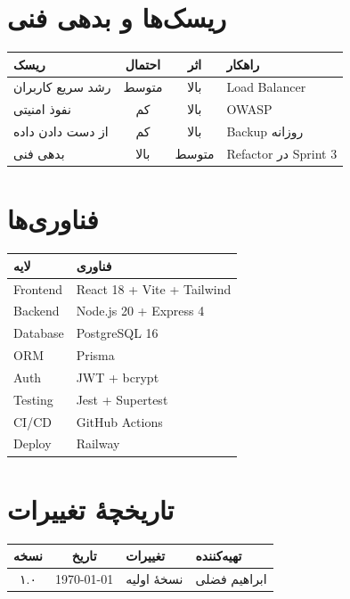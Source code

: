 \documentclass[12pt, a4paper]{article}
\begin{document}
\section{ریسک‌ها و بدهی فنی}

\begin{center}
\begin{tabular}{|p{3cm}|c|c|p{4cm}|}
\hline
\textbf{ریسک} & \textbf{احتمال} & \textbf{اثر} & \textbf{راهکار} \\
\hline
رشد سریع کاربران & متوسط & بالا & Load Balancer \\
\hline
نفوذ امنیتی & کم & بالا & OWASP \\
\hline
از دست دادن داده & کم & بالا & Backup روزانه \\
\hline
بدهی فنی & بالا & متوسط & Refactor در Sprint 3 \\
\hline
\end{tabular}
\end{center}

\section{فناوری‌ها}

\begin{center}
\begin{tabular}{|l|l|}
\hline
\textbf{لایه} & \textbf{فناوری} \\
\hline
Frontend & React 18 + Vite + Tailwind \\
\hline
Backend & Node.js 20 + Express 4 \\
\hline
Database & PostgreSQL 16 \\
\hline
ORM & Prisma \\
\hline
Auth & JWT + bcrypt \\
\hline
Testing & Jest + Supertest \\
\hline
CI/CD & GitHub Actions \\
\hline
Deploy & Railway \\
\hline
\end{tabular}
\end{center}

\appendix
\section{تاریخچهٔ تغییرات}

\begin{center}
\begin{tabular}{|c|c|l|l|}
\hline
\textbf{نسخه} & \textbf{تاریخ} & \textbf{تغییرات} & \textbf{تهیه‌کننده} \\
\hline
۱.۰ & \today & نسخهٔ اولیه & ابراهیم فضلی \\
\hline
\end{tabular}
\end{center}
\end{document}
